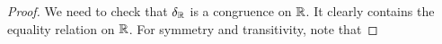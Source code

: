 \documentclass[letterpaper,11pt]{article}
\begin{document}
\begin{proof}
We need to check that $\delta_{\mathbb{R}}$ is a congruence on $\mathbb{R}$. It clearly contains the equality relation on $\mathbb{R}$. For symmetry and transitivity, note that

\end{proof}
\end{document}
